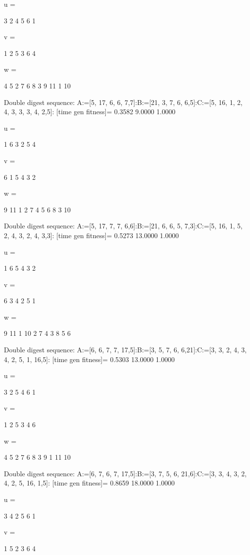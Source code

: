 u =

     3     2     4     5     6     1


v =

     1     2     5     3     6     4


w =

     4     5     2     7     6     8     3     9    11     1    10

Double digest sequence:
A:=[5, 17, 6, 6, 7,7]:B:=[21, 3, 7, 6, 6,5]:C:=[5, 16, 1, 2, 4, 3, 3, 3, 4, 2,5]:
[time gen fitness]=
    0.3582    9.0000    1.0000


u =

     1     6     3     2     5     4


v =

     6     1     5     4     3     2


w =

     9    11     1     2     7     4     5     6     8     3    10

Double digest sequence:
A:=[5, 17, 7, 7, 6,6]:B:=[21, 6, 6, 5, 7,3]:C:=[5, 16, 1, 5, 2, 4, 3, 2, 4, 3,3]:
[time gen fitness]=
    0.5273   13.0000    1.0000


u =

     1     6     5     4     3     2


v =

     6     3     4     2     5     1


w =

     9    11     1    10     2     7     4     3     8     5     6

Double digest sequence:
A:=[6, 6, 7, 7, 17,5]:B:=[3, 5, 7, 6, 6,21]:C:=[3, 3, 2, 4, 3, 4, 2, 5, 1, 16,5]:
[time gen fitness]=
    0.5303   13.0000    1.0000


u =

     3     2     5     4     6     1


v =

     1     2     5     3     4     6


w =

     4     5     2     7     6     8     3     9     1    11    10

Double digest sequence:
A:=[6, 7, 6, 7, 17,5]:B:=[3, 7, 5, 6, 21,6]:C:=[3, 3, 4, 3, 2, 4, 2, 5, 16, 1,5]:
[time gen fitness]=
    0.8659   18.0000    1.0000


u =

     3     4     2     5     6     1


v =

     1     5     2     3     6     4


